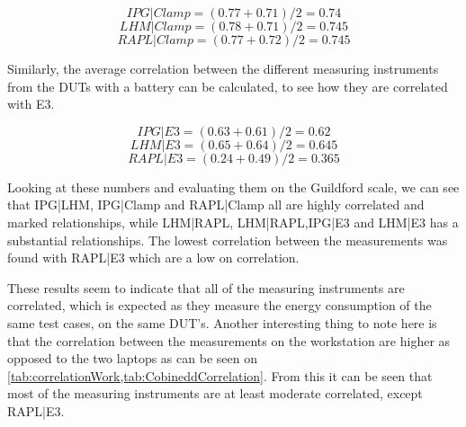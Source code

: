 $$IPG|Clamp = (0.77+0.71)/2 = 0.74$$
$$LHM|Clamp = (0.78+0.71)/2 = 0.745$$
$$RAPL|Clamp = (0.77+0.72)/2 = 0.745$$

Similarly, the average correlation between the different measuring instruments from the DUTs with a battery can be calculated, to see how they are correlated with E3.

$$IPG|E3 = (0.63+0.61)/2 = 0.62$$
$$LHM|E3 = (0.65+0.64)/2 = 0.645$$
$$RAPL|E3 = (0.24+0.49)/2 = 0.365$$

Looking at these numbers and evaluating them on the Guildford scale, we can see that IPG|LHM, IPG|Clamp and RAPL|Clamp all are highly correlated and marked relationships, while LHM|RAPL, LHM|RAPL,IPG|E3 and LHM|E3 has a substantial relationships. The lowest correlation between the measurements was found with RAPL|E3 which are a low on correlation.

These results seem to indicate that all of the measuring instruments are correlated, which is expected as they measure the energy consumption of the same test cases, on the same DUT's. Another interesting thing to note here is that the correlation between the measurements on the workstation are higher as opposed to the two laptops as can be seen on \cref{tab:correlationWork,tab:CobineddCorrelation}. From this it can be seen that most of the measuring instruments are at least moderate correlated, except RAPL|E3.





